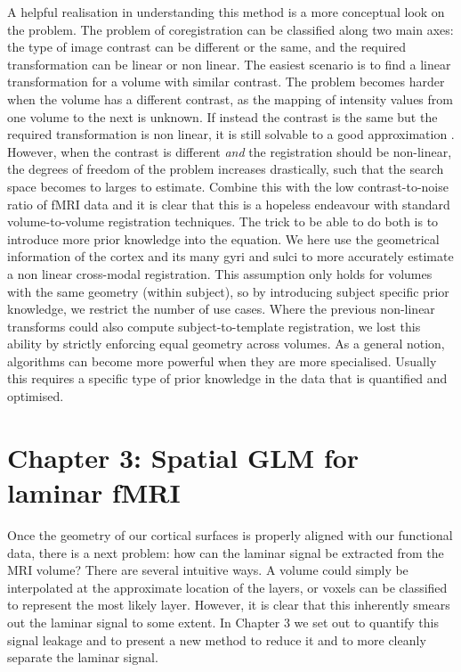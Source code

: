 A helpful realisation in understanding this method is a more conceptual look on the problem. The problem of coregistration can be classified along two main axes: the type of image contrast can be different or the same, and the required transformation can be linear or non linear. The easiest scenario is to find a linear transformation for a volume with similar contrast. The problem becomes harder when the volume has a different contrast, as the mapping of intensity values from one volume to the next is unknown. If instead the contrast is the same but the required transformation is non linear, it is still solvable to a good approximation \cite{Collins1995}. However, when the contrast is different \emph{and} the registration should be non-linear, the degrees of freedom of the problem increases drastically, such that the search space becomes to larges to estimate. Combine this with the low contrast-to-noise ratio of fMRI data and it is clear that this is a hopeless endeavour with standard volume-to-volume registration techniques. The trick to be able to do both is to introduce more prior knowledge into the equation. We here use the geometrical information of the cortex and its many gyri and sulci to more accurately estimate a non linear cross-modal registration. This assumption only holds for volumes with the same geometry (within subject), so by introducing subject specific prior knowledge, we restrict the number of use cases. Where the previous non-linear transforms could also compute subject-to-template registration, we lost this ability by strictly enforcing equal geometry across volumes. As a general notion, algorithms can become more powerful when they are more specialised. Usually this requires a specific type of prior knowledge in the data that is quantified and optimised.

\section*{Chapter 3: Spatial GLM for laminar fMRI}
Once the geometry of our cortical surfaces is properly aligned with our functional data, there is a next problem: how can the laminar signal be extracted from the MRI volume? There are several intuitive ways. A volume could simply be interpolated at the approximate location of the layers, or voxels can be classified to represent the most likely layer. However, it is clear that this inherently smears out the laminar signal to some extent. In Chapter 3 we set out to quantify this signal leakage and to present a new method to reduce it and to more cleanly separate the laminar signal.

